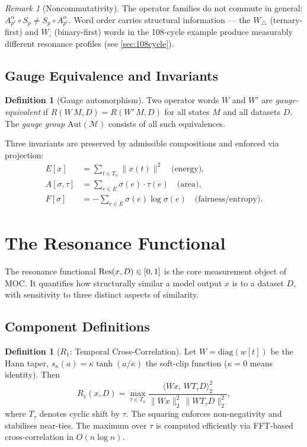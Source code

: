 \documentclass[11pt,a4paper]{article}
\theoremstyle{plain}
\theoremstyle{definition}
\newtheorem{definition}[theorem]{Definition}
\theoremstyle{remark}
\newtheorem{remark}[theorem]{Remark}
\newcommand{\multsp}{\mathcal{M}}
\begin{document}
\begin{remark}[Noncommutativity]
  The operator families do not commute in general:
  $A_{p^r}^\alpha \circ S_p \neq S_p \circ A_{p^r}^\alpha$.
  Word order carries structural information --- the $W_\triangle$ (ternary-first) and
  $W_\square$ (binary-first) words in the 108-cycle example produce measurably different
  resonance profiles (see \cref{sec:108cycle}).
\end{remark}

\subsection{Gauge Equivalence and Invariants}

\begin{definition}[Gauge automorphism]
  Two operator words $W$ and $W'$ are \emph{gauge-equivalent} if $R(W\,M, D) = R(W'\,M, D)$
  for all states $M$ and all datasets $D$. The \emph{gauge group} $\mathrm{Aut}(\multsp)$
  consists of all such equivalences.
\end{definition}

Three invariants are preserved by admissible compositions and enforced via projection:
\begin{align}
  E[x] &= \sum_{t \in T_n} \|x(t)\|^2 \quad \text{(energy)}, \\
  A[\sigma, \tau] &= \sum_{e \in E} \sigma(e) \cdot \tau(e) \quad \text{(area)}, \\
  F[\sigma] &= -\sum_{e \in E} \sigma(e) \log \sigma(e) \quad \text{(fairness/entropy)}.
\end{align}

\section{The Resonance Functional}

The resonance functional $\Res(x, D) \in [0,1]$ is the core measurement object of MOC.
It quantifies how structurally similar a model output $x$ is to a dataset $D$, with
sensitivity to three distinct aspects of similarity.

\subsection{Component Definitions}

\begin{definition}[$R_1$: Temporal Cross-Correlation]
  Let $W = \mathrm{diag}(w[t])$ be the Hann taper, $s_\kappa(a) = \kappa\tanh(a/\kappa)$
  the soft-clip function ($\kappa = 0$ means identity). Then
  \[
    R_1(x, D) = \max_{\tau \in T_n}
    \frac{\langle Wx,\, W T_\tau D \rangle_2^2}
         {\|Wx\|_2^2\, \|WT_\tau D\|_2^2},
  \]
  where $T_\tau$ denotes cyclic shift by $\tau$. The squaring enforces
  non-negativity and stabilises near-ties. The maximum over $\tau$ is computed
  efficiently via FFT-based cross-correlation in $O(n \log n)$.
\end{definition}
\end{document}
